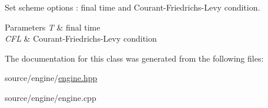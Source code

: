 Set scheme options \+: final time and Courant-\/\+Friedrichs-\/\+Levy condition. 


\begin{DoxyParams}{Parameters}
{\em T} & final time \\
\hline
{\em C\+FL} & Courant-\/\+Friedrichs-\/\+Levy condition \\
\hline
\end{DoxyParams}


The documentation for this class was generated from the following files\+:\begin{DoxyCompactItemize}
\item 
source/engine/\hyperlink{source_2engine_2engine_8hpp}{engine.\+hpp}\item 
source/engine/engine.\+cpp\end{DoxyCompactItemize}
